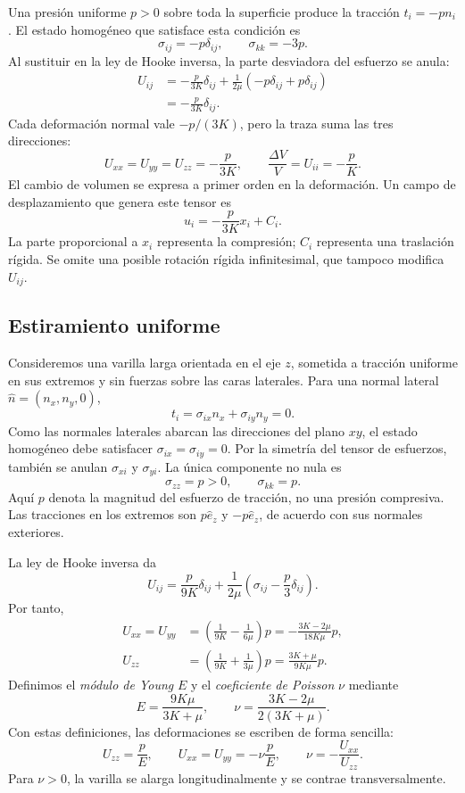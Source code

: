 Una presión uniforme $p>0$ sobre toda la superficie produce la tracción $t_i=-pn_i$. El estado homogéneo que satisface esta condición es
\[
\sigma_{ij}=-p\delta_{ij},
\qquad \sigma_{kk}=-3p.
\]
Al sustituir en la ley de Hooke inversa, la parte desviadora del esfuerzo se anula:
\[
\begin{aligned}
U_{ij}
&=-\frac{p}{3K}\delta_{ij}
+\frac{1}{2\mu}\left(-p\delta_{ij}+p\delta_{ij}\right)\\
&=\boxed{-\frac{p}{3K}\delta_{ij}}.
\end{aligned}
\]
Cada deformación normal vale $-p/(3K)$, pero la traza suma las tres direcciones:
\[
U_{xx}=U_{yy}=U_{zz}=-\frac{p}{3K},
\qquad
\frac{\Delta V}{V}=U_{ii}=-\frac{p}{K}.
\]
El cambio de volumen se expresa a primer orden en la deformación. Un campo de desplazamiento que genera este tensor es
\[
u_i=-\frac{p}{3K}x_i+C_i.
\]
La parte proporcional a $x_i$ representa la compresión; $C_i$ representa una traslación rígida. Se omite una posible rotación rígida infinitesimal, que tampoco modifica $U_{ij}$.

\subsection{Estiramiento uniforme}

Consideremos una varilla larga orientada en el eje $z$, sometida a tracción uniforme en sus extremos y sin fuerzas sobre las caras laterales. Para una normal lateral $\hat n=(n_x,n_y,0)$,
\[
t_i=\sigma_{ix}n_x+\sigma_{iy}n_y=0.
\]
Como las normales laterales abarcan las direcciones del plano $xy$, el estado homogéneo debe satisfacer $\sigma_{ix}=\sigma_{iy}=0$. Por la simetría del tensor de esfuerzos, también se anulan $\sigma_{xi}$ y $\sigma_{yi}$. La única componente no nula es
\[
\sigma_{zz}=p>0,
\qquad \sigma_{kk}=p.
\]
Aquí $p$ denota la magnitud del esfuerzo de tracción, no una presión compresiva. Las tracciones en los extremos son $p\hat e_z$ y $-p\hat e_z$, de acuerdo con sus normales exteriores.

La ley de Hooke inversa da
\[
U_{ij}=\frac{p}{9K}\delta_{ij}
+\frac{1}{2\mu}\left(\sigma_{ij}-\frac{p}{3}\delta_{ij}\right).
\]
Por tanto,
\[
\begin{aligned}
U_{xx}=U_{yy}
&=\left(\frac{1}{9K}-\frac{1}{6\mu}\right)p
=-\frac{3K-2\mu}{18K\mu}p,\\
U_{zz}
&=\left(\frac{1}{9K}+\frac{1}{3\mu}\right)p
=\frac{3K+\mu}{9K\mu}p.
\end{aligned}
\]
Definimos el \emph{módulo de Young} $E$ y el \emph{coeficiente de Poisson} $\nu$ mediante
\[
\boxed{E=\frac{9K\mu}{3K+\mu}},
\qquad
\boxed{\nu=\frac{3K-2\mu}{2(3K+\mu)}}.
\]
Con estas definiciones, las deformaciones se escriben de forma sencilla:
\[
U_{zz}=\frac{p}{E},
\qquad U_{xx}=U_{yy}=-\nu\frac{p}{E},
\qquad \nu=-\frac{U_{xx}}{U_{zz}}.
\]
Para $\nu>0$, la varilla se alarga longitudinalmente y se contrae transversalmente.

